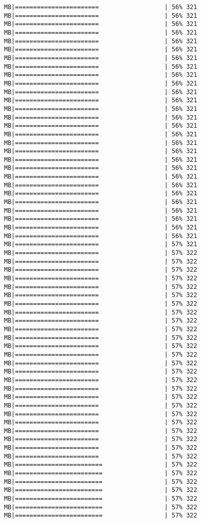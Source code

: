 \documentclass[
]{article}
\begin{document}
\begin{verbatim}
MB|=======================                  | 56% 321 MB|=======================                  | 56% 321 MB|=======================                  | 56% 321 MB|=======================                  | 56% 321 MB|=======================                  | 56% 321 MB|=======================                  | 56% 321 MB|=======================                  | 56% 321 MB|=======================                  | 56% 321 MB|=======================                  | 56% 321 MB|=======================                  | 56% 321 MB|=======================                  | 56% 321 MB|=======================                  | 56% 321 MB|=======================                  | 56% 321 MB|=======================                  | 56% 321 MB|=======================                  | 56% 321 MB|=======================                  | 56% 321 MB|=======================                  | 56% 321 MB|=======================                  | 56% 321 MB|=======================                  | 56% 321 MB|=======================                  | 56% 321 MB|=======================                  | 56% 321 MB|=======================                  | 56% 321 MB|=======================                  | 56% 321 MB|=======================                  | 56% 321 MB|=======================                  | 56% 321 MB|=======================                  | 56% 321 MB|=======================                  | 56% 321 MB|=======================                  | 56% 321 MB|=======================                  | 57% 321 MB|=======================                  | 57% 322 MB|=======================                  | 57% 322 MB|=======================                  | 57% 322 MB|=======================                  | 57% 322 MB|=======================                  | 57% 322 MB|=======================                  | 57% 322 MB|=======================                  | 57% 322 MB|=======================                  | 57% 322 MB|=======================                  | 57% 322 MB|=======================                  | 57% 322 MB|=======================                  | 57% 322 MB|=======================                  | 57% 322 MB|=======================                  | 57% 322 MB|=======================                  | 57% 322 MB|=======================                  | 57% 322 MB|=======================                  | 57% 322 MB|=======================                  | 57% 322 MB|=======================                  | 57% 322 MB|=======================                  | 57% 322 MB|=======================                  | 57% 322 MB|=======================                  | 57% 322 MB|=======================                  | 57% 322 MB|=======================                  | 57% 322 MB|=======================                  | 57% 322 MB|=======================                  | 57% 322 MB|========================                 | 57% 322 MB|========================                 | 57% 322 MB|========================                 | 57% 322 MB|========================                 | 57% 322 MB|========================                 | 57% 322 MB|========================                 | 57% 322 MB|========================                 | 57% 322 
\end{verbatim}
\end{document}
